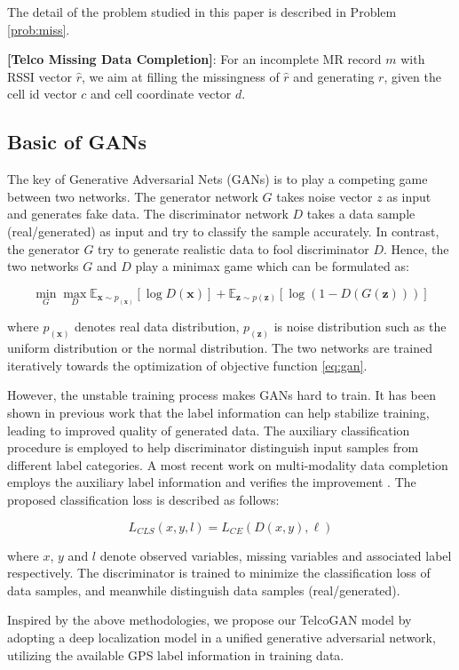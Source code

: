 The detail of the problem studied in this paper is described in Problem \ref{prob:miss}.

\begin{problem}\label{prob:miss}
  \textbf{[Telco Missing Data Completion]}: For an incomplete MR record $m$ with RSSI vector $\hat{r}$, we aim at filling the missingness of $\hat{r}$ and generating $r$, given the cell id vector $c$ and cell coordinate vector $d$.
\end{problem}

\subsection{Basic of GANs}
The key of Generative Adversarial Nets (GANs) \cite{DBLP:conf/nips/GoodfellowPMXWOCB14} is to play a competing game between two networks. The generator network $G$ takes noise vector $z$ as input and generates fake data. The discriminator network $D$ takes a data sample (real/generated) as input and try to classify the sample accurately. In contrast, the generator $G$ try to generate realistic data to fool discriminator $D$. Hence, the two networks $G$ and $D$ play a minimax game which can be formulated as:

\begin{equation}\label{eq:gan}
  \min\limits_G \max\limits_D \mathbb{E}_{\textbf{x}\sim p_(\textbf{x})}[\log D(\textbf{x})]+\mathbb{E}_{\textbf{z}\sim p( \textbf{z})}[\log(1-D(G(\textbf{z})))]
\end{equation}

where $p_(\textbf{x})$ denotes real data distribution, $p_(\textbf{z})$ is noise distribution such as the uniform distribution or the normal distribution. The two networks are trained iteratively towards the optimization of objective function \ref{eq:gan}.

However, the unstable training process makes GANs hard to train. It has been shown in previous work \cite{DBLP:conf/icml/OdenaOS17} that the label information can help stabilize training, leading to improved quality of generated data. The auxiliary classification procedure is employed to help discriminator distinguish input samples from different label categories. A most recent work on multi-modality data completion employs the auxiliary label information and verifies the improvement \cite{DBLP:conf/kdd/CaiWGSJ18}. The proposed classification loss is described as follows:

\begin{equation}\label{eq:multi}
  L_{CLS}(x, y, l)=L_{CE}(D(x,y),\ell)
\end{equation}

where $x$, $y$ and $l$ denote observed variables, missing variables and associated label respectively. The discriminator is trained to minimize the classification loss of data samples, and meanwhile distinguish data samples (real/generated).

Inspired by the above methodologies, we propose our TelcoGAN model by adopting a deep localization model in a unified generative adversarial network, utilizing the available GPS label information in training data.
